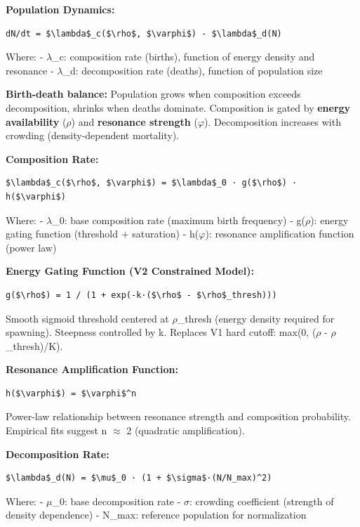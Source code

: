 \documentclass[
]{article}
\begin{document}
\textbf{Population Dynamics:}

\begin{verbatim}
dN/dt = $\lambda$_c($\rho$, $\varphi$) - $\lambda$_d(N)
\end{verbatim}

Where: - $\lambda$\_c: composition rate (births), function of energy density and
resonance - $\lambda$\_d: decomposition rate (deaths), function of population
size

\textbf{Birth-death balance:} Population grows when composition exceeds
decomposition, shrinks when deaths dominate. Composition is gated by
\textbf{energy availability} ($\rho$) and \textbf{resonance strength} ($\varphi$).
Decomposition increases with crowding (density-dependent mortality).

\textbf{Composition Rate:}

\begin{verbatim}
$\lambda$_c($\rho$, $\varphi$) = $\lambda$_0 · g($\rho$) · h($\varphi$)
\end{verbatim}

Where: - $\lambda$\_0: base composition rate (maximum birth frequency) - g($\rho$):
energy gating function (threshold + saturation) - h($\varphi$): resonance
amplification function (power law)

\textbf{Energy Gating Function (V2 Constrained Model):}

\begin{verbatim}
g($\rho$) = 1 / (1 + exp(-k·($\rho$ - $\rho$_thresh)))
\end{verbatim}

Smooth sigmoid threshold centered at $\rho$\_thresh (energy density required
for spawning). Steepness controlled by k. Replaces V1 hard cutoff:
max(0, ($\rho$ - $\rho$\_thresh)/K).

\textbf{Resonance Amplification Function:}

\begin{verbatim}
h($\varphi$) = $\varphi$^n
\end{verbatim}

Power-law relationship between resonance strength and composition
probability. Empirical fits suggest n $\approx$ 2 (quadratic amplification).

\textbf{Decomposition Rate:}

\begin{verbatim}
$\lambda$_d(N) = $\mu$_0 · (1 + $\sigma$·(N/N_max)^2)
\end{verbatim}

Where: - $\mu$\_0: base decomposition rate - $\sigma$: crowding coefficient
(strength of density dependence) - N\_max: reference population for
normalization
\end{document}
